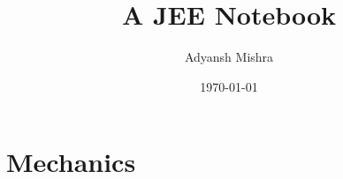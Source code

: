 \documentclass[twoside, a4paper, 10pt, bibliography=totoc, index=totoc, listof=totoc]{scrbook}
\begin{document}
    \author{Adyansh Mishra}
    \date{\today}
    \title{A JEE Notebook}
    \fncytitle

    \tableofcontents
     
    \frontmatter
    
    
    \mainmatter
    \setcounter{chapter}{-2}
    
    

    \part{Mechanics}
    
  
\end{document}
